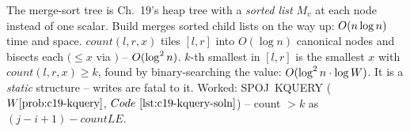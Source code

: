 \begin{recallbox}
The merge-sort tree is Ch.~19's heap tree with a \emph{sorted list} \(M_v\) at each node instead of one scalar.  Build merges sorted child lists on the way up: \(O(n\log n)\) time and space.  \(\mathit{count}(l,r,x)\) tiles \([l,r]\) into \(O(\log n)\) canonical nodes and bisects each \((\le x\) via \()\) -- \(O(\log^2 n)\).  \(k\)-th smallest in \([l,r]\) is the smallest \(x\) with \(\mathit{count}(l,r,x)\ge k\), found by binary-searching the value: \(O(\log^2 n\cdot\log W)\).  It is a \emph{static} structure -- writes are fatal to it.  Worked: SPOJ~KQUERY (\(\probref{c19-kquery}\), \(\coderef{c19-kquery-soln}\)) -- count \(>k\) as \((j-i+1)-\mathit{countLE}\).
\end{recallbox}
